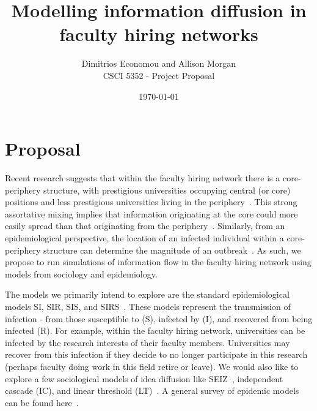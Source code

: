 \documentclass{article}
\title{Modelling information diffusion in faculty hiring networks}
\author{
  Dimitrios Economou and Allison Morgan \\
  CSCI 5352 - Project Proposal
}
\date{\today}
\begin{document}
\maketitle

\section{Proposal}\label{proposal}
Recent research suggests that within the faculty hiring network there is a core-periphery structure, with prestigious universities occupying central (or core) positions and less prestigious universities living in the periphery~\cite{clauset:hiring}. This strong assortative mixing implies that information originating at the core could more easily spread than that originating from the periphery~\cite{clauset:hiring}. Similarly, from an epidemiological perspective, the location of an infected individual within a core-periphery structure can determine the magnitude of an outbreak~\cite{newman:networks}. As such, we propose to run simulations of information flow in the faculty hiring network using models from sociology and epidemiology.

The models we primarily intend to explore are the standard epidemiological
models SI, SIR, SIS, and SIRS~\cite{newman:networks}. These models represent the
transmission of infection - from those susceptible to (S), infected by (I), and
recovered from being infected (R). For example, within the faculty hiring
network, universities can be infected by the research interests of their faculty
members. Universities may recover from this infection if they decide to no
longer participate in this research (perhaps faculty doing work in this field
retire or leave). We would also like to explore a few sociological models of
idea diffusion like SEIZ~\cite{bettencourt:ideaspread}, independent cascade
(IC), and linear threshold (LT)~\cite{gaussier:infodiffusion,infodiffusionstanford}. A general survey of epidemic models can be found here~\cite{epidemicsurvey}.
\end{document}
